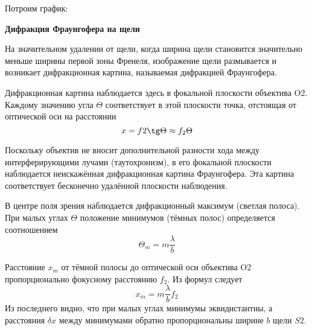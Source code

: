 \documentclass[14pt]{article}
\begin{document}
Потроим график:
\begin{flushleft}
\end{flushleft}

\vspace{1cm}
\textbf{Дифракция Фраунгофера на щели}

На значительном удалении от щели, когда ширина щели становится значительно меньше ширины первой зоны Френеля, изображение щели размывается и возникает дифракционная картина, называемая дифракцией Фраунгофера.

Дифракционная картина наблюдается здесь в фокальной плоскости объектива O2. Каждому значению угла $\Theta$ соответствует в этой плоскости точка, отстоящая от оптической оси на расстоянии
$$
	x = f2 \tg\Theta \approx f_2\Theta
$$

Поскольку объектив не вносит дополнительной разности хода между интерферирующими лучами (таутохронизм), в его фокальной плоскости наблюдается неискажённая дифракционная картина Фраунгофера. Эта картина соответствует бесконечно удалённой плоскости наблюдения.

В центре поля зрения наблюдается дифракционный максимум (светлая полоса). При малых углах $\Theta$ положение минимумов (тёмных полос) определяется соотношением
$$
	\Theta_m = m\frac{\lambda}{b}
$$

Расстояние $x_m$ от тёмной полосы до оптической оси объектива O2 пропорционально фокусному расстоянию $f_2$. Из формул следует
$$
	x_m = m\frac{\lambda}{b}f_2
$$
Из последнего видно, что при малых углах минимумы эквидистантны, а расстояния $\delta x$ между минимумами обратно пропорциональны ширине $b$ щели $S2$.
\end{document}
